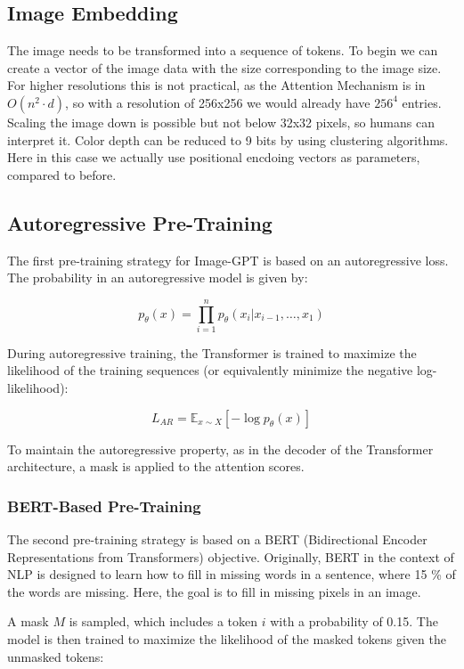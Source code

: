 \documentclass[a4paper]{article}
\begin{document}
\subsection{Image Embedding}
The image needs to be transformed into a sequence of tokens. To begin we can create a vector of the image data with the size corresponding to the image size. For higher resolutions this is not practical, as the Attention Mechanism is in \(O(n^2 \cdot d)\), so with a resolution of 256x256 we would already have $256^4$ entries.  Scaling the image down is possible but not below 32x32 pixels, so humans can interpret it. Color depth can be 
reduced to 9 bits by using clustering algorithms. Here in this case we actually use positional encdoing vectors as parameters, compared to before. 

\subsection{Autoregressive Pre-Training}


The first pre-training strategy for Image-GPT is based on an autoregressive loss. The probability in an autoregressive model is given by:

\[
p_{\theta}(x) = \prod_{i=1}^{n} p_{\theta}(x_i | x_{i-1}, \ldots, x_1)
\]

During autoregressive training, the Transformer is trained to maximize the likelihood of the training sequences (or equivalently minimize the negative log-likelihood):

\[
L_{AR} = \mathbb{E}_{x \sim X} [-\log p_{\theta}(x)]
\]

To maintain the autoregressive property, as in the decoder of the Transformer architecture, a mask is applied to the attention scores.

\subsubsection{BERT-Based Pre-Training}

The second pre-training strategy is based on a BERT (Bidirectional Encoder Representations from Transformers) objective. Originally, BERT in the context of NLP is designed to learn how to fill in missing words in a sentence, where 15 \% of the words are missing. Here, the goal is to fill in missing pixels in an image.

A mask \( M \) is sampled, which includes a token \( i \) with a probability of 0.15. The model is then trained to maximize the likelihood of the masked tokens given the unmasked tokens:
\end{document}

